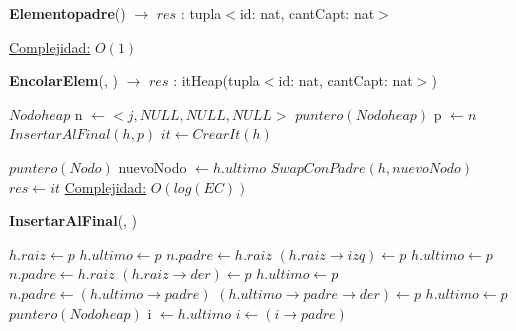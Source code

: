 \begin{Algoritmos}
\begin{algorithm}[H]{\textbf{Elementopadre}() $\to$ $res$ : tupla$<$id: nat, cantCapt: nat$>$}
\begin{algorithmic}[1]
			\medskip
			\Statex \underline{Complejidad:} $O(1)$
    	\end{algorithmic}   	
\end{algorithm}

\begin{algorithm}[H]{\textbf{EncolarElem}(, ) $\to$ $res$ : itHeap(tupla$<$id: nat, cantCapt: nat$>$)}
    	\begin{algorithmic}[1]
    	\State $Nodoheap$ n $\gets <j, NULL, NULL, NULL>$
    	\State $puntero(Nodoheap)$ p $\gets n$    	
		\State $InsertarAlFinal(h, p)$
		\State $it \gets CrearIt(h)$
		\newpage		
		
			\State $puntero(Nodo)$ nuevoNodo $\gets h.ultimo$			
					\State $SwapConPadre(h, nuevoNodo)$
				\EndIf
			\EndWhile
		\EndIf
		\State $res \gets it$
			\medskip
			\Statex \underline{Complejidad:} $O(log(EC))$
    	\end{algorithmic}   	
\end{algorithm}

\begin{algorithm}[H]{\textbf{InsertarAlFinal}(, )}
    	\begin{algorithmic}[1]
    		\State $h.raiz \gets p$
    		\State $h.ultimo \gets p$
    	\Else
    			\State $n.padre \gets h.raiz$
    			\State $(h.raiz \rightarrow izq) \gets p$
    			\State $h.ultimo \gets p$   
    		\Else
    				\State $n.padre \gets h.raiz$
    				\State $(h.raiz \rightarrow der) \gets p$
    				\State $h.ultimo \gets p$
    			\Else
    					\State $n.padre \gets (h.ultimo \rightarrow padre)$
    					\State $(h.ultimo \rightarrow padre \rightarrow der) \gets p$
    					\State $h.ultimo \gets p$
    				\Else
						\State $puntero(Nodoheap)$ i $\gets h.ultimo$    					
    						\State $i \gets (i \rightarrow padre)$
    					

\end{algorithmic}
\end{algorithm}
\end{Algoritmos}
